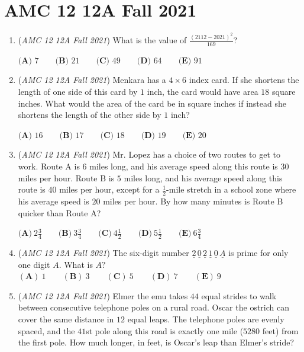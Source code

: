 \section{AMC 12 12A Fall 2021}
        \begin{enumerate}
        	\item (\textit{AMC 12 12A Fall 2021}) What is the value of $\frac{(2112-2021)^2}{169}$?


 $\textbf{(A) } 7 \qquad\textbf{(B) } 21 \qquad\textbf{(C) } 49 \qquad\textbf{(D) } 64 \qquad\textbf{(E) } 91$


	\item (\textit{AMC 12 12A Fall 2021}) Menkara has a $4 \times 6$ index card. If she shortens the length of one side of this card by $1$ inch, the card would have area $18$ square inches. What would the area of the card be in square inches if instead she shortens the length of the other side by $1$ inch?


 $\textbf{(A) }16\qquad\textbf{(B) }17\qquad\textbf{(C) }18\qquad\textbf{(D) }19\qquad\textbf{(E) }20$


	\item (\textit{AMC 12 12A Fall 2021}) Mr. Lopez has a choice of two routes to get to work. Route A is $6$ miles long, and his average speed along this route is $30$ miles per hour. Route B is $5$ miles long, and his average speed along this route is $40$ miles per hour, except for a $\frac{1}{2}$-mile stretch in a school zone where his average speed is $20$ miles per hour. By how many minutes is Route B quicker than Route A?


 $\textbf{(A)}\ 2 \frac{3}{4}  \qquad\textbf{(B)}\  3 \frac{3}{4} \qquad\textbf{(C)}\  4 \frac{1}{2} \qquad\textbf{(D)}\  5 \frac{1}{2} \qquad\textbf{(E)}\ 6 \frac{3}{4}$


	\item (\textit{AMC 12 12A Fall 2021}) The six-digit number $\underline{2}\,\underline{0}\,\underline{2}\,\underline{1}\,\underline{0}\,\underline{A}$ is prime for only one digit $A.$ What is $A?$
$(\textbf{A})\: 1\qquad(\textbf{B}) \: 3\qquad(\textbf{C}) \: 5 \qquad(\textbf{D}) \: 7\qquad(\textbf{E}) \: 9$


	\item (\textit{AMC 12 12A Fall 2021}) Elmer the emu takes $44$ equal strides to walk between consecutive telephone poles on a rural road. Oscar the ostrich can cover the same distance in $12$ equal leaps. The telephone poles are evenly spaced, and the $41$st pole along this road is exactly one mile ($5280$ feet) from the first pole. How much longer, in feet, is Oscar's leap than Elmer's stride?



\end{enumerate}
